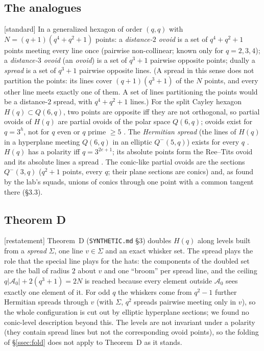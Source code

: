 \documentclass[11pt]{amsart}
\theoremstyle{definition}
\theoremstyle{remark}
\newcommand{\status}[1]{\textup{[#1]}}
\begin{document}
\subsection{The analogues}
\status{standard} In a generalized hexagon of order $(q,q)$ with $N=(q+1)(q^4+q^2+1)$ points: a \emph{distance-$2$
ovoid} is a set of $q^4+q^2+1$ points meeting every line once (pairwise non-collinear; known only for $q=2,3,4$);
a \emph{distance-$3$ ovoid} (an \emph{ovoid}) is a set of $q^3+1$ pairwise opposite points; dually a \emph{spread} is a
set of $q^3+1$ pairwise opposite lines. (A spread in this sense does not partition the points: its lines cover
$(q+1)(q^3+1)$ of the $N$ points, and every other line meets exactly one of them. A set of lines partitioning the points
would be a distance-$2$ spread, with $q^4+q^2+1$ lines.) For the
split Cayley hexagon $H(q)\subset Q(6,q)$, two points are opposite iff they are not orthogonal, so partial ovoids of
$H(q)$ are partial ovoids of the polar space $Q(6,q)$; ovoids exist for $q=3^h$, not for $q$ even \cite{Th81} or $q$
prime $\ge5$ \cite{BGS06}. The \emph{Hermitian spread} (the lines of $H(q)$ in a hyperplane meeting $Q(6,q)$ in an
elliptic $Q^-(5,q)$) exists for every $q$ \cite{Th80}. $H(q)$ has a polarity iff $q=3^{2e+1}$; its absolute points
form the Ree--Tits ovoid and its absolute lines a spread \cite{VM98}. The conic-like partial ovoids are the sections
$Q^-(3,q)$ ($q^2+1$ points, every $q$; their plane sections are conics) and, as found by the lab's squads, unions of
conics through one point with a common tangent there (\S3.3).

\subsection{Theorem D}
\status{restatement} Theorem~D (\texttt{SYNTHETIC.md} \S3) doubles $H(q)$ along levels built from a \emph{spread}
$\Sigma$, one line $v\in\Sigma$ and an exact whisker set. The spread plays the role that the special line plays for
the hats: the components of the doubled set are the ball of radius $2$ about $v$ and one ``broom'' per spread line,
and the ceiling $q|\mathcal A_0|+2(q^3+1)=2N$ is reached because every element outside $\mathcal A_0$ sees exactly one
element of it. For odd $q$ the whiskers come from $q^2-1$ further Hermitian spreads through $v$ (with $\Sigma$, $q^2$
spreads pairwise meeting only in $v$), so the whole configuration is cut out by elliptic hyperplane sections; we
found no conic-level description beyond this. The levels are not invariant under a polarity (they contain spread
lines but not the corresponding ovoid points), so the folding of \S\ref{ssec:fold} does not apply to Theorem~D as it stands.
\end{document}
